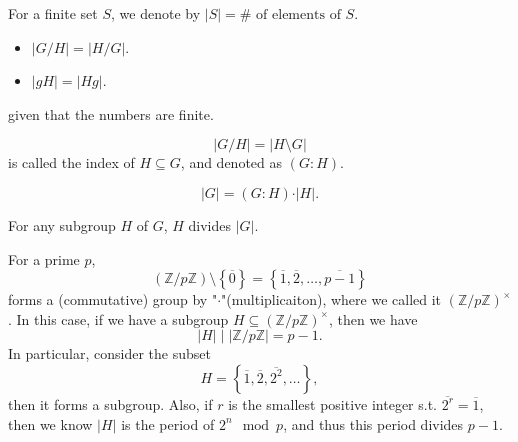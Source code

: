 \begin{remark}
    For a finite set \(S\), we denote by \(\vert S \vert = \# \text{ of elements of } S\).  
\end{remark}

\begin{theorem}
    \vphantom{text}
    \begin{itemize}
        \item \(\left\vert G / H \right\vert = \left\vert H / G \right\vert  \). 
        \item \(\left\vert gH \right\vert = \left\vert Hg \right\vert  \).  
    \end{itemize}
    given that the numbers are finite.
\end{theorem}

\begin{notation}
    \[
        \left\vert G / H \right\vert = \left\vert H \setminus G \right\vert  
    \] is called the index of \(H \subseteq G\), and denoted as \((G:H)\).   
\end{notation}

\begin{theorem}
    \[
        \vert G \vert = (G:H) \cdot \vert H \vert.
    \]
\end{theorem}

\begin{corollary} \label{cl: Lagrange theorem}
    For any subgroup \(H\) of \(G\), \(H\) divides \(\vert G \vert \).
\end{corollary}

\begin{eg}
    For a prime \(p\), 
    \[
        \left( \mathbb{Z} / p \mathbb{Z}  \right) \setminus \left\{ \overline{0} \right\} = \left\{ \overline{1}, \overline{2}, \dots , \overline{p-1}   \right\}   
    \]forms a (commutative) group by "\(\cdot\)"(multiplicaiton), where we called it \(\left( \mathbb{Z} / p \mathbb{Z}  \right)^{\times } \). In this case, if we have a subgroup \(H \subseteq (\mathbb{Z} / p \mathbb{Z} )^{\times }\), then we have
    \[
        \vert H \vert \mid \left\vert \mathbb{Z} / p \mathbb{Z}  \right\vert  = p - 1.  
    \] In particular, consider the subset
    \[
        H = \left\{ \overline{1}, \overline{2}, \overline{2^2}, \dots    \right\},
    \] then it forms a subgroup. Also, if \(r\) is the smallest positive integer s.t. \(\overline{2^r} = \overline{1} \), then we know \(\vert H \vert \) is the period of \(2^n \mod{p}\), and thus this period divides \(p - 1\). 
\end{eg}